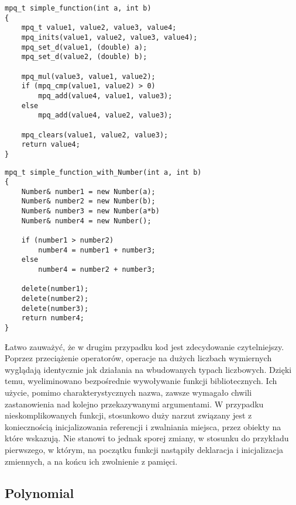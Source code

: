 \documentclass[twoside,a4paper]{book}
\begin{document}
\begin{lstlisting}
mpq_t simple_function(int a, int b)
{
	mpq_t value1, value2, value3, value4;
	mpq_inits(value1, value2, value3, value4);
	mpq_set_d(value1, (double) a);
	mpq_set_d(value2, (double) b);

	mpq_mul(value3, value1, value2);
	if (mpq_cmp(value1, value2) > 0)
		mpq_add(value4, value1, value3);
	else
		mpq_add(value4, value2, value3);

	mpq_clears(value1, value2, value3);
	return value4;
}
\end{lstlisting}

\begin{lstlisting}
mpq_t simple_function_with_Number(int a, int b)
{
	Number& number1 = new Number(a);
	Number& number2 = new Number(b);
	Number& number3 = new Number(a*b)
	Number& number4 = new Number();

	if (number1 > number2)
		number4 = number1 + number3;
	else
		number4 = number2 + number3;

	delete(number1);
	delete(number2);
	delete(number3);
	return number4;
}
\end{lstlisting}

Łatwo zauważyć, że w drugim przypadku kod jest zdecydowanie czytelniejszy. Poprzez przeciążenie operatorów, operacje na dużych liczbach wymiernych wyglądają identycznie jak działania na wbudowanych typach liczbowych. Dzięki temu, wyeliminowano bezpośrednie wywoływanie funkcji bibliotecznych. Ich użycie, pomimo charakterystycznych nazwa, zawsze wymagało chwili zastanowienia nad kolejno przekazywanymi argumentami. W przypadku nieskomplikowanych funkcji, stosunkowo duży narzut związany jest z koniecznością inicjalizowania referencji i zwalniania miejsca, przez obiekty na które wskazują. Nie stanowi to jednak sporej zmiany, w stosunku do przykładu pierwszego, w którym, na początku funkcji nastąpiły deklaracja i inicjalizacja zmiennych, a na końcu ich zwolnienie z pamięci.


\subsection{Polynomial}
\end{document}
